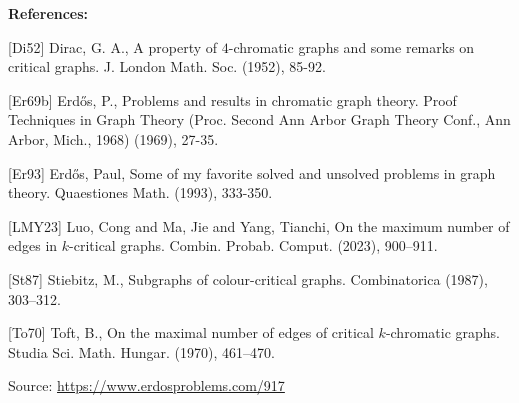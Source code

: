 \documentclass{article}
\begin{document}
\bigskip
\noindent\textbf{References:}

[Di52] Dirac, G. A., A property of {$4$}-chromatic graphs and some remarks on
critical graphs. J. London Math. Soc. (1952), 85-92.
 
 [Er69b] Erd\H{o}s, P., Problems and results in chromatic graph theory. Proof Techniques in Graph Theory (Proc. Second Ann
Arbor Graph Theory Conf., Ann Arbor, Mich.,
1968) (1969), 27-35.
 
 [Er93] Erd\H{o}s, Paul, Some of my favorite solved and unsolved problems in graph theory. Quaestiones Math. (1993), 333-350.
 
 [LMY23] Luo, Cong and Ma, Jie and Yang, Tianchi, On the maximum number of edges in {$k$}-critical graphs. Combin. Probab. Comput. (2023), 900--911.
 
 [St87] Stiebitz, M., Subgraphs of colour-critical graphs. Combinatorica (1987), 303--312.
 
 [To70] Toft, B., On the maximal number of edges of critical {$k$}-chromatic
graphs. Studia Sci. Math. Hungar. (1970), 461--470.

\bigskip
\noindent\small{Source: \url{https://www.erdosproblems.com/917}}
\end{document}
